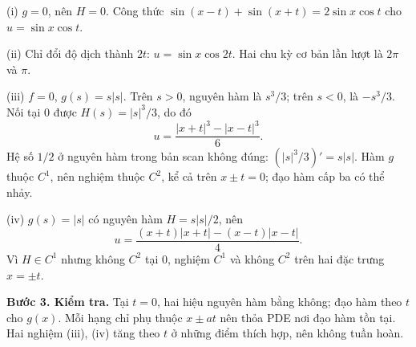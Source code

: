 \documentclass[10pt,a4paper]{article}
\begin{document}
(i) $g=0$, nên $H=0$. Công thức $\sin(x-t)+\sin(x+t)=2\sin x\cos t$ cho $u=\sin x\cos t$.

(ii) Chỉ đổi độ dịch thành $2t$: $u=\sin x\cos2t$. Hai chu kỳ cơ bản lần lượt là $2\pi$ và $\pi$.

(iii) $f=0$, $g(s)=s|s|$. Trên $s>0$, nguyên hàm là $s^3/3$; trên $s<0$, là $-s^3/3$. Nối tại $0$ được $H(s)=|s|^3/3$, do đó
\[u=\frac{|x+t|^3-|x-t|^3}{6}.\]
Hệ số $1/2$ ở nguyên hàm trong bản scan không đúng: $(|s|^3/3)'=s|s|$. Hàm $g$ thuộc $C^1$, nên nghiệm thuộc $C^2$, kể cả trên $x\pm t=0$; đạo hàm cấp ba có thể nhảy.

(iv) $g(s)=|s|$ có nguyên hàm $H=s|s|/2$, nên
\[u=\frac{(x+t)|x+t|-(x-t)|x-t|}{4}.\]
Vì $H\in C^1$ nhưng không $C^2$ tại $0$, nghiệm $C^1$ và không $C^2$ trên hai đặc trưng $x=\pm t$.

\textbf{Bước 3. Kiểm tra.} Tại $t=0$, hai hiệu nguyên hàm bằng không; đạo hàm theo $t$ cho $g(x)$. Mỗi hạng chỉ phụ thuộc $x\pm at$ nên thỏa PDE nơi đạo hàm tồn tại. Hai nghiệm (iii), (iv) tăng theo $t$ ở những điểm thích hợp, nên không tuần hoàn.
\end{document}
